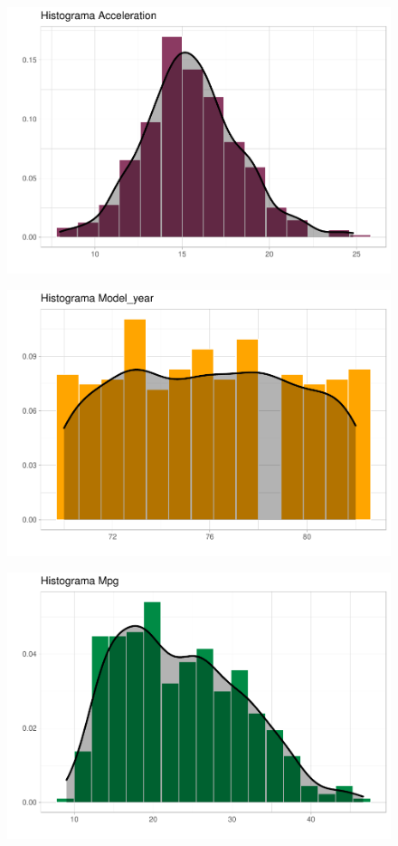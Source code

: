 \begin{figure}[H]\includegraphics[width=.9\linewidth]{img/EDA_files/figure-latex/unnamed-chunk-7-4} \caption{}\end{figure}
\begin{figure}[H]\includegraphics[width=.9\linewidth]{img/EDA_files/figure-latex/unnamed-chunk-7-5} \caption{}\end{figure}
\begin{figure}[H]\includegraphics[width=.9\linewidth]{img/EDA_files/figure-latex/unnamed-chunk-7-6} \caption{}\end{figure}

